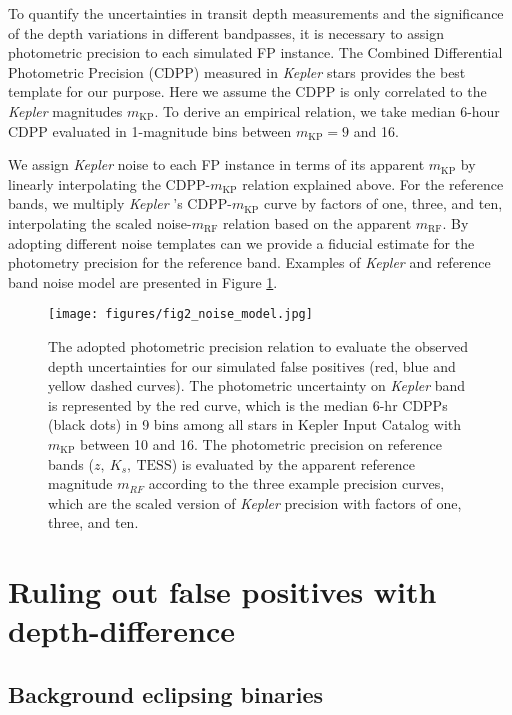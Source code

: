 \documentclass{aastex63}
\begin{document}
    To quantify the uncertainties in transit depth measurements and the significance of the depth variations in different bandpasses, it is necessary to assign photometric precision to each simulated FP instance. The Combined Differential Photometric Precision (CDPP) measured in \emph{Kepler} stars provides the best template for our purpose. Here we assume the CDPP is only correlated to the \emph{Kepler} magnitudes $m_\mathrm{KP}$. To derive an empirical relation, we take median 6-hour CDPP evaluated in 1-magnitude bins between $m_\mathrm{KP}=9$ and 16. 
    
    We assign \emph{Kepler} noise to each FP instance in terms of its apparent $m_\mathrm{KP}$ by linearly interpolating the CDPP-$m_\mathrm{KP}$ relation explained above. For the reference bands, we multiply \emph{Kepler} 's CDPP-$m_\mathrm{KP}$ curve by factors of one, three, and ten, interpolating the scaled noise-$m_\mathrm{RF}$ relation based on the apparent $m_\mathrm{RF}$. By adopting different noise templates can we provide a fiducial estimate for the photometry precision for the reference band. Examples of \emph{Kepler} and reference band noise model are presented in Figure \ref{fig:noisemodel}.
    
    \begin{figure}[ht]
        \centering
        \texttt{[image: figures/fig2\_noise\_model.jpg]}
        \caption{The adopted photometric precision relation to evaluate the observed depth uncertainties for our simulated false positives (red, blue and yellow dashed curves). The photometric uncertainty on \emph{Kepler} band is represented by the red curve, which is the median 6-hr CDPPs (black dots) in 9 bins among all stars in Kepler Input Catalog with $m_\mathrm{KP}$ between 10 and 16. The photometric precision on reference bands ($z,~K_s,~\mathrm{TESS}$) is evaluated by the apparent reference magnitude $m_{RF}$ according to the three example precision curves, which are the scaled version of \emph{Kepler} precision with factors of one, three, and ten.}
        \label{fig:noisemodel}
    \end{figure}


\section{Ruling out false positives with depth-difference}
\label{sec:ruleoutfp}

\subsection{Background eclipsing binaries}
\label{sec:beb}
\end{document}
